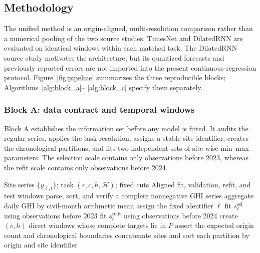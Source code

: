 \subsection{Methodology}
\label{sec:methodology}

The unified method is an origin-aligned, multi-resolution comparison rather
than a numerical pooling of the two source studies. TimesNet
\cite{wu2023} and DilatedRNN \cite{chang2017} are evaluated on identical
windows within each matched task. The DilatedRNN source study motivates the
architecture, but its quantized forecasts and previously reported errors are not imported
into the present continuous-regression protocol. Figure~\ref{fig:pipeline}
summarizes the three reproducible blocks; Algorithms~\ref{alg:block_a}--%
\ref{alg:block_c} specify them separately.



\subsubsection{Block A: data contract and temporal windows}

Block A establishes the information set before any model is fitted. It audits
the regular series, applies the task resolution, assigns a stable site
identifier, creates the chronological partitions, and fits two independent
sets of site-wise min--max parameters. The selection scale contains only
observations before 2023, whereas the refit scale contains only observations
before 2024.

\begin{algorithm}[!t]
\caption{Block A: leakage-controlled data preparation}
\label{alg:block_a}
\begin{algorithmic}[1]
\Require Site series $\{y_{\ell,t}\}$; task $(r,c,h,\mathcal{H})$; fixed cuts
\Ensure Aligned fit, validation, refit, and test windows
  \State parse, sort, and verify a complete nonnegative GHI series
    \State aggregate daily GHI by civil-month arithmetic mean
  \EndIf
  \State assign the fixed identifier $\ell$
  \State fit $s_{\ell}^{\mathrm{sel}}$ using observations before 2023
  \State fit $s_{\ell}^{\mathrm{refit}}$ using observations before 2024
    \State create $(c,h)$ direct windows whose complete targets lie in $P$
    \State assert the expected origin count and chronological boundaries
  \EndFor
\EndFor
\State concatenate sites and sort each partition by origin and site identifier
\end{algorithmic}
\end{algorithm}

